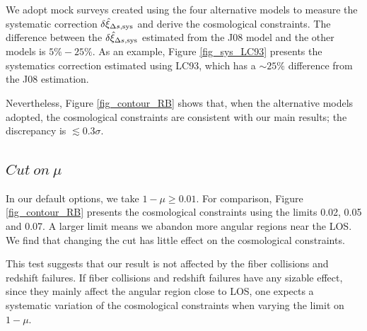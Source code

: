 \documentclass[iop]{emulateapj}
\begin{document}
We adopt mock surveys created using the four alternative models to
measure the systematic correction $\delta \hat\xi_{\Delta s, {\rm sys}}$
and derive the cosmological constraints.
The difference between the $\delta \hat\xi_{\Delta s, {\rm sys}}$ estimated from the J08 model and the other models is $5\%-25\%$.
As an example, Figure \ref{fig_sys_LC93} presents the systematics correction estimated using LC93,
which has a $\sim25\%$ difference from the J08 estimation.

Nevertheless, Figure \ref{fig_contour_RB} shows that, 
when the alternative models adopted, 
the cosmological constraints are consistent with our main results;
the discrepancy is $\lesssim0.3\sigma$.




\subsection{$Cut\ on\ \mu$}

In our default options, we take $1 - \mu\ge0.01$.
For comparison, Figure \ref{fig_contour_RB} presents the cosmological constraints using the limits 
0.02, 0.05 and 0.07. 
A larger limit means we abandon more angular regions near the LOS.
We find that changing the cut has little effect on the cosmological constraints.

This test suggests that our result is not affected by the fiber collisions and redshift failures.
If fiber collisions and redshift failures have any sizable effect,
since they mainly affect the angular region close to LOS,
one expects a systematic variation of the cosmological constraints when varying the limit on $1-\mu$.
\end{document}
